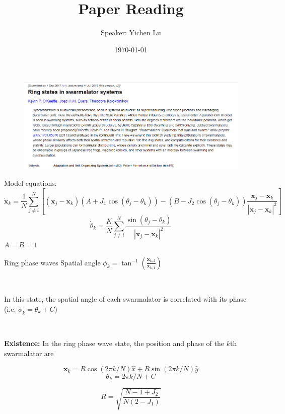 \documentclass[10pt,aspectratio=43,mathserif,table]{beamer}
\title{Paper Reading}
\author{Speaker: Yichen Lu\quad \newline  \newline \quad }
\institute{\fontsize{8pt}{14pt}}
\date{\today}
\begin{document}
\begin{frame}
    \begin{figure}
        \centering
        \includegraphics[width=\textwidth]{title.png}
    \end{figure}
\end{frame}

\begin{frame}
    Model equations:
    {
    \small
    $$
    \dot{\mathbf{x}}_k=\frac{1}{N}\sum_{j\ne i}^N{\left[ \left( \mathbf{x}_j-\mathbf{x}_k \right) \left( A+J_1\cos \left( \theta _j-\theta _k \right) \right) -\left( B-J_2\cos \left( \theta _j-\theta _k \right) \right) \frac{\mathbf{x}_j-\mathbf{x}_k}{\left| \mathbf{x}_j-\mathbf{x}_k \right|^2} \right]}
    $$
    $$
    \dot{\theta}_k=\frac{K}{N}\sum_{j\ne i}^N{\frac{\sin \left( \theta _j-\theta _k \right)}{\left| \mathbf{x}_j-\mathbf{x}_k \right|^2}}
    $$
    }
    $A=B=1$
\end{frame}

\begin{frame}{Ring phase waves}
    Spatial angle $\phi _k=\tan ^{-1}\left( \frac{\mathbf{x}_{k,2}}{\mathbf{x}_{k,1}} \right) $

    $ $

    In this state, the spatial angle of each swarmalator is correlated with its phase (i.e. $\phi _k=\theta _k + C$)

    $ $

    \textbf{Existence: } In the ring phase wave state, the position and phase of the $k$th swarmalator are

    $$
    \mathbf{x}_k=R\cos \left( 2\pi k/N \right) \hat{x}+R\sin \left( 2\pi k/N \right) \hat{y}
    $$
    $$
    \theta _k=2\pi k/N+C
    $$

    $$
    R=\sqrt{\frac{N-1+J_2}{N\left( 2-J_1 \right)}}
    $$

\end{frame}
\end{document}
